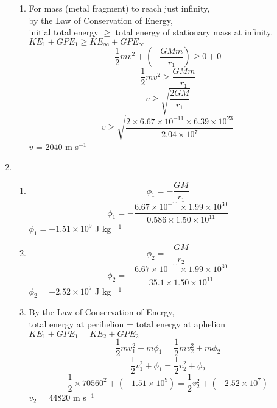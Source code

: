 \documentclass[a4paper,12pt]{article}
\begin{document}
\begin{enumerate}
\begin{enumerate}
\item For mass (metal fragment) to reach just infinity,\\
by the Law of Conservation of Energy,\\
initial total energy $\ge$ total energy of stationary mass at infinity.\\
$ KE_1 + GPE_1 \ge KE_{\infty} + GPE_{\infty} $ \\
\[\frac{1}{2}mv^2 +  \left( -\frac{GMm}{r_1} \right) \ge 0 + 0  \]
\[\frac{1}{2}mv^2 \ge  \frac{GMm}{r_1} \]
\[ v \ge \sqrt{\frac{2GM}{r_1}}    \]
\[ v \ge \sqrt{\frac{2 \times 6.67 \times 10^{-11} \times 6.39 \times 10^{23}}{2.04 \times 10^7}}    \]
$v$ = 2040 m s$^{-1}$ \\
 

\end{enumerate}

\item 
\begin{enumerate}
\item
\[\phi_1 = -\frac{GM}{r_1}  \]
\[\phi_1 = -\frac{6.67 \times 10^{-11} \times 1.99 \times 10^{30}}{0.586 \times 1.50 \times 10^{11}}  \]
$ \phi_1 = -1.51 \times 10^9 $ J kg $^{-1}$ \\

\item
\[\phi_2 = -\frac{GM}{r_2}  \]
\[\phi_2 = -\frac{6.67 \times 10^{-11} \times 1.99 \times 10^{30}}{35.1 \times 1.50 \times 10^{11}}  \]
$ \phi_2 = -2.52 \times 10^7 $ J kg $^{-1}$ \\

\item
By the Law of Conservation of Energy,\\
total energy at perihelion = total energy at aphelion \\
$KE_1 + GPE_1 = KE_2 + GPE_2 $\\
\[ \frac{1}{2}mv_1^2 + m \phi_1 =  \frac{1}{2}mv_2^2 + m \phi_2   \]
\[ \frac{1}{2}v_1^2 + \phi_1 =  \frac{1}{2}v_2^2 + \phi_2   \]
\[ \frac{1}{2}\times 70560^2 + (-1.51 \times 10^9) =  \frac{1}{2}v_2^2 + (-2.52 \times 10^7)   \]
$ v_2$ = 44820 m s$^{-1}$ \\

\end{enumerate}

\end{enumerate}
\end{document}
